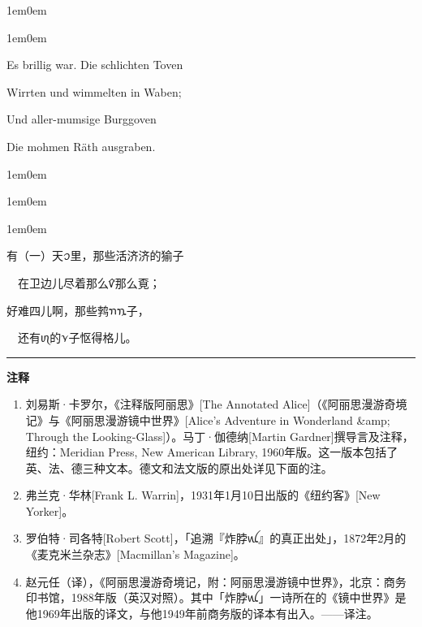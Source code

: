\documentclass[
  12pt,
  twoside,
  openright,
  oldfontcommands,
]{memoir}
\begin{document}
\hfill\break

\begin{adjustwidth}{1em}{0em}

\begin{adjustwidth}{1em}{0em}

Es brillig war. Die schlichten Toven

Wirrten und wimmelten in Waben;

Und aller-mumsige Burggoven

Die mohmen Räth\textquotesingle{} ausgraben.

\end{adjustwidth}

\end{adjustwidth}

\hfill\break

\begin{adjustwidth}{1em}{0em}

\begin{adjustwidth}{1em}{0em}

\begin{adjustwidth}{1em}{0em}

有（一）天{\gebfont ꪫ}里，那些活济济的㺄子

　在卫边儿尽着那么{\gebfont ꪥ}那么覔；

好难四儿啊，那些鹁{\gebfont ꪦ}{\gebfont ꪧ}子，

　还有{\gebfont ꪨ}的{\gebfont ꪩ}子怄得格儿。

\end{adjustwidth}

\end{adjustwidth}

\end{adjustwidth}

{\footnotesize\setlength{\parindent}{0pt}%
\noindent\textcolor{rulegray}{\rule{0.35\linewidth}{0.3pt}}\par\vspace{2pt}
\noindent\textbf{注释}\par\vspace{3pt}
\begin{enumerate}
\label{fn:Dialog12-1}{}
\item 刘易斯·卡罗尔，《注释版阿丽思》[The Annotated Alice]（《阿丽思漫游奇境记》与《阿丽思漫游镜中世界》[Alice’s Adventure in Wonderland \&amp; Through the Looking-Glass]）。马丁·伽德纳[Martin Gardner]撰导言及注释，纽约：Meridian Press, New American Library, 1960年版。这一版本包括了英、法、德三种文本。德文和法文版的原出处详见下面的注。
\label{fn:Dialog12-2}{}
\item 弗兰克·华林[Frank L. Warrin]，1931年1月10日出版的《纽约客》[New Yorker]。
\label{fn:Dialog12-3}{}
\item 罗伯特·司各特[Robert Scott]，「追溯『炸脖{\gebfont ꪡ}』的真正出处」，1872年2月的《麦克米兰杂志》[Macmillan's Magazine]。
\label{fn:Dialog12-4}{}
\item 赵元任（译），《阿丽思漫游奇境记，附：阿丽思漫游镜中世界》，北京：商务印书馆，1988年版（英汉对照）。其中「炸脖{\gebfont ꪡ}」一诗所在的《镜中世界》是他1969年出版的译文，与他1949年前商务版的译本有出入。——译注。
\end{enumerate}
}
\end{document}
